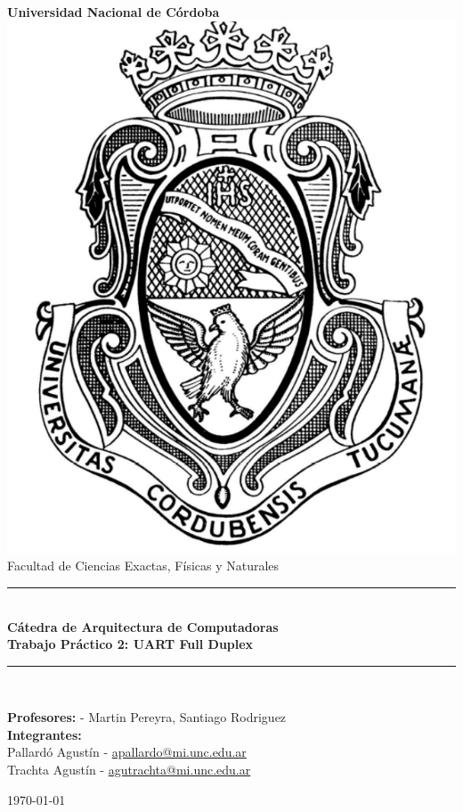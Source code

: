 \begin{titlepage}
    \begin{center}
        {\LARGE \textbf{Universidad Nacional de Córdoba}}\\[1.5cm]

        \includegraphics[scale=0.4]{img/logo2.png}\\[1.5cm]

        {\large Facultad de Ciencias Exactas, Físicas y Naturales}\\

        \rule{\linewidth}{0.5mm}\\[0.4cm]
        {\Large \textbf{Cátedra de Arquitectura de Computadoras}}\\[0.3cm]
        {\LARGE \textbf{Trabajo Práctico 2: UART Full Duplex}}\\[0.3cm]
        \rule{\linewidth}{0.5mm}\\[1cm]

        \begin{flushleft}
        {\large 
            \textbf{Profesores:} - Martin Pereyra, Santiago Rodriguez\\
            \textbf{Integrantes:}\\
            Pallardó Agustín - 
            \href{mailto:apallardo@mi.unc.edu.ar}{apallardo@mi.unc.edu.ar}\\
            Trachta Agustín - 
            \href{mailto:agutrachta@mi.unc.edu.ar}{agutrachta@mi.unc.edu.ar}\\
        }
        \end{flushleft}

        \vfill

        {\large \today}
    \end{center}
\end{titlepage}